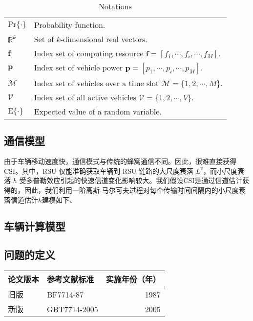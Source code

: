 \begin{table}[!ht]
\caption{Notations}
\centering
{\small\begin{tabular}{ll}
\hline
\hline
\label{table:1}
$\textrm{Pr}\{\cdot\}$  & \!\!\!\!\!\!Probability function. \\
$\mathbb{R}^k$  & \!\!\!\!\!\!\!\!\! Set of $k$-dimensional real vectors.\\
$\mathbf{f}$  & \!\!\!\!\!\!\!Index set of computing resource $\mathbf{f}$$=$$[f_1,\cdots,f_i,\cdots,f_M]$. \\
$\mathbf{p}$  & \!\!\!\!\!\!\!\!\! Index set of vehicle power $\mathbf{p}$$=$$[p_1,\cdots,p_i,\cdots,p_M]$. \\
$\mathcal{M}$  & \!\!\!\!\!\!\!Index set of vehicles over a time slot $\mathcal{M}$$=$$\{1,2,\cdots,M\}$.\\
$\mathcal{V}$  & \!\!\!\!\!\!\!Index set of all active vehicles $\mathcal{V}$$=$$\{1,2,\cdots,V\}$.\\
$\textrm{E}\{\cdot\}$ & \!\!\!\!\!\!\!Expected value of a random variable. \\
\hline
\hline
\end{tabular}}
\end{table}
\subsection{通信模型}\label{section3-2-1}
由于车辆移动速度快，通信模式与传统的蜂窝通信不同。因此，很难直接获得 CSI。其中，RSU 仅能准确获取车辆到 RSU 链路的大尺度衰落 $L^2$，而小尺度衰落 $h$ 受多普勒效应引起的快速信道变化影响较大。我们假设CSI是通过信道估计获得的，因此，我们利用一阶高斯-马尔可夫过程\cite{Kim2011}对每个传输时间间隔内的小尺度衰落信道估计$h$建模如下、

\subsection{车辆计算模型}\label{section3-2-2}

\subsection{问题的定义}\label{section3-2-3}
\begin{table}[htbp!]
 \centering\small
 \label{tab:ysubof}
\begin{tabular}{llr}
 \toprule
    论文版本    & 参考文献标准    & 实施年份（年）  \\
 \midrule
    旧版        & BF7714-87       & 1987            \\
    新版        & GBT7714-2005    & 2005            \\
 \bottomrule
 \end{tabular}
\end{table}

